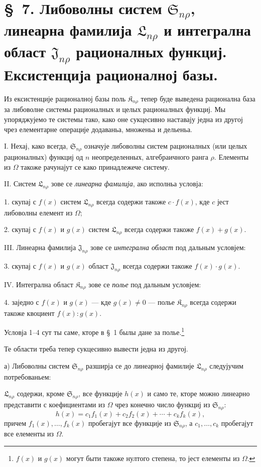 ﻿\documentclass[11pt]{article}
\providecommand{\Kfield}{\mathfrak{K}}
\providecommand{\Ssys}{\mathfrak{S}}
\providecommand{\Jdom}{\mathfrak{J}}
\providecommand{\Lsys}{\mathfrak{L}}
\begin{document}
\section*{\S\ 7. Либоволны систем $\Ssys_{n\rho}$, линеарна фамилија $\Lsys_{n\rho}$ и интегрална област $\Jdom_{n\rho}$ рационалных функциј. Ексистенција рационалној базы.}

Из ексистенције рационалној базы поль $\Kfield_{n\rho}$ тепер буде выведена рационална база за либоволне системы рационалных и целых рационалных функциј. Мы упоряджујемо те системы тако, како оне сукцесивно наставају једна из другој чрез елементарне операције додаваньа, множеньа и дельеньа.

I. Нехај, како всегда, $\Ssys_{n\rho}$ означује либоволны систем рационалных (или целых рационалных) функциј од $n$ неопределенных, алгебраичного ранга $\rho$. Елементы из $\Omega$ такоже рачунајут се како принадлежече систему.

II. Систем $\Lsys_{n\rho}$ зове се {\itshape линеарна фамилија}, ако исполньа условја:

1. скупај с $f(x)$ систем $\Lsys_{n\rho}$ всегда содержи такоже $c\cdot f(x)$, кде $c$ јест либоволны елемент из $\Omega$;

2. скупај с $f(x)$ и $g(x)$ систем $\Lsys_{n\rho}$ всегда содержи такоже $f(x)+g(x)$.

III. Линеарна фамилија $\Jdom_{n\rho}$ зове се {\itshape интегрална област} под дальным условјем:

3. скупај с $f(x)$ и $g(x)$ област $\Jdom_{n\rho}$ всегда содержи такоже $f(x)\cdot g(x)$.

IV. Интегрална област $\Kfield_{n\rho}$ зове се {\itshape полье} под дальным условјем:

4. заједно с $f(x)$ и $g(x)$ --- кде $g(x)\ne0$ --- полье $\Kfield_{n\rho}$ всегда содержи такоже квоциент $f(x):g(x)$.

Условја 1--4 сут ты саме, кторе в \S\ 1 былы дане за полье.\footnote{$f(x)$ и $g(x)$ могут быти такоже нултого степена, то јест елементы из $\Omega$.}

Те области треба тепер сукцесивно вывести једна из другој.

а) Либоволны систем $\Ssys_{n\rho}$ разширја се до линеарној фамилије $\Lsys_{n\rho}$ следујучим потребованьем:

$\Lsys_{n\rho}$ содержи, кроме $\Ssys_{n\rho}$, все функције $h(x)$ и само те, кторе можно линеарно представити с коефициентами из $\Omega$ чрез конечно число функциј из $\Ssys_{n\rho}$:
\[
  h(x)=c_1f_1(x)+c_2f_2(x)+\cdots+c_kf_k(x),
\]
причем $f_1(x),\ldots,f_k(x)$ пробегајут все функције из $\Ssys_{n\rho}$, а $c_1,\ldots,c_k$ пробегајут все елементы из $\Omega$.
\end{document}
